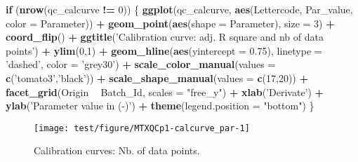 \documentclass[9pt,]{article}
\newenvironment{Shaded}{\begin{snugshade}}{\end{snugshade}}
\newcommand{\KeywordTok}[1]{\textcolor[rgb]{0.13,0.29,0.53}{\textbf{#1}}}
\newcommand{\DataTypeTok}[1]{\textcolor[rgb]{0.13,0.29,0.53}{#1}}
\newcommand{\DecValTok}[1]{\textcolor[rgb]{0.00,0.00,0.81}{#1}}
\newcommand{\FloatTok}[1]{\textcolor[rgb]{0.00,0.00,0.81}{#1}}
\newcommand{\StringTok}[1]{\textcolor[rgb]{0.31,0.60,0.02}{#1}}
\newcommand{\ControlFlowTok}[1]{\textcolor[rgb]{0.13,0.29,0.53}{\textbf{#1}}}
\newcommand{\OperatorTok}[1]{\textcolor[rgb]{0.81,0.36,0.00}{\textbf{#1}}}
\newcommand{\NormalTok}[1]{#1}
\begin{document}
\begin{Shaded}
\begin{Highlighting}[]
\ControlFlowTok{if}\NormalTok{ (}\KeywordTok{nrow}\NormalTok{(qc_calcurve }\OperatorTok{!=}\StringTok{ }\DecValTok{0}\NormalTok{)) \{}
  \KeywordTok{ggplot}\NormalTok{(qc_calcurve, }\KeywordTok{aes}\NormalTok{(Lettercode, Par_value, }\DataTypeTok{color =}\NormalTok{ Parameter)) }\OperatorTok{+}
\StringTok{        }\KeywordTok{geom_point}\NormalTok{(}\KeywordTok{aes}\NormalTok{(}\DataTypeTok{shape =}\NormalTok{ Parameter), }\DataTypeTok{size =} \DecValTok{3}\NormalTok{) }\OperatorTok{+}
\StringTok{    }\KeywordTok{coord_flip}\NormalTok{() }\OperatorTok{+}
\StringTok{    }\KeywordTok{ggtitle}\NormalTok{(}\StringTok{'Calibration curve: adj. R square and nb of data points'}\NormalTok{) }\OperatorTok{+}
\StringTok{    }\KeywordTok{ylim}\NormalTok{(}\DecValTok{0}\NormalTok{,}\DecValTok{1}\NormalTok{) }\OperatorTok{+}
\StringTok{    }\KeywordTok{geom_hline}\NormalTok{(}\KeywordTok{aes}\NormalTok{(}\DataTypeTok{yintercept =} \FloatTok{0.75}\NormalTok{), }\DataTypeTok{linetype =} \StringTok{'dashed'}\NormalTok{, }\DataTypeTok{color =} \StringTok{'grey30'}\NormalTok{) }\OperatorTok{+}
\StringTok{    }\KeywordTok{scale_color_manual}\NormalTok{(}\DataTypeTok{values =} \KeywordTok{c}\NormalTok{(}\StringTok{'tomato3'}\NormalTok{,}\StringTok{'black'}\NormalTok{)) }\OperatorTok{+}
\StringTok{    }\KeywordTok{scale_shape_manual}\NormalTok{(}\DataTypeTok{values =} \KeywordTok{c}\NormalTok{(}\DecValTok{17}\NormalTok{,}\DecValTok{20}\NormalTok{)) }\OperatorTok{+}
\StringTok{    }\KeywordTok{facet_grid}\NormalTok{(Origin }\OperatorTok{~}\StringTok{ }\NormalTok{Batch_Id, }\DataTypeTok{scales =} \StringTok{"free_y"}\NormalTok{) }\OperatorTok{+}
\StringTok{        }\KeywordTok{xlab}\NormalTok{(}\StringTok{'Derivate'}\NormalTok{) }\OperatorTok{+}
\StringTok{        }\KeywordTok{ylab}\NormalTok{(}\StringTok{'Parameter value in (-)'}\NormalTok{) }\OperatorTok{+}
\StringTok{    }\KeywordTok{theme}\NormalTok{(}\DataTypeTok{legend.position =} \StringTok{"bottom"}\NormalTok{)}
\NormalTok{\}}
\end{Highlighting}
\end{Shaded}

\begin{figure}

{\centering \texttt{[image: test/figure/MTXQCp1-calcurve\_par-1]} 

}

\caption{Calibration curves: Nb. of data points.}\label{fig:calcurve_par}
\end{figure}
\end{document}
